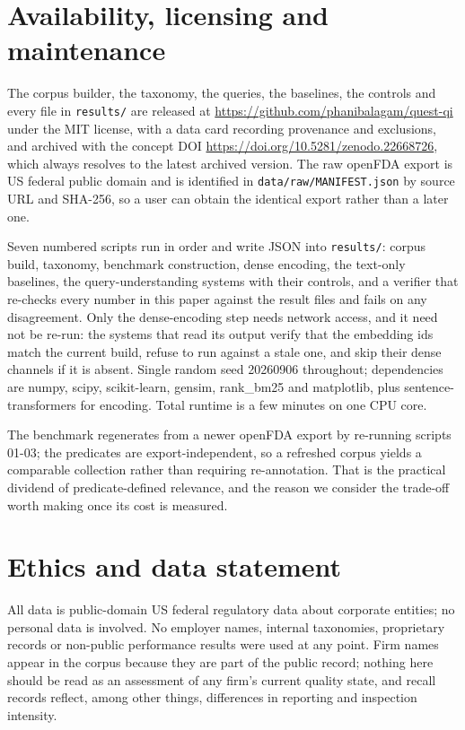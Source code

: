 \documentclass[runningheads]{llncs}
\begin{document}
\section{Availability, licensing and maintenance}
The corpus builder, the taxonomy, the queries, the baselines, the controls and every file in \texttt{results/} are released at \url{https://github.com/phanibalagam/quest-qi} under the MIT license, with a data card recording provenance and exclusions, and archived with the concept DOI \url{https://doi.org/10.5281/zenodo.22668726}, which always resolves to the latest archived version. The raw openFDA export is US federal public domain and is identified in \texttt{data/raw/\allowbreak{}MANIFEST.json} by source URL and SHA-256, so a user can obtain the identical export rather than a later one.

Seven numbered scripts run in order and write JSON into \texttt{results/}: corpus build, taxonomy, benchmark construction, dense encoding, the text-only baselines, the query-understanding systems with their controls, and a verifier that re-checks every number in this paper against the result files and fails on any disagreement. Only the dense-encoding step needs network access, and it need not be re-run: the systems that read its output verify that the embedding ids match the current build, refuse to run against a stale one, and skip their dense channels if it is absent. Single random seed 20260906 throughout; dependencies are numpy, scipy, scikit-learn, gensim, rank\_bm25 and matplotlib, plus sentence-transformers for encoding. Total runtime is a few minutes on one CPU core.

The benchmark regenerates from a newer openFDA export by re-running scripts 01-03; the predicates are export-independent, so a refreshed corpus yields a comparable collection rather than requiring re-annotation. That is the practical dividend of predicate-defined relevance, and the reason we consider the trade-off worth making once its cost is measured.


\section*{Ethics and data statement}
All data is public-domain US federal regulatory data about corporate entities; no personal data is involved. No employer names, internal taxonomies, proprietary records or non-public performance results were used at any point. Firm names appear in the corpus because they are part of the public record; nothing here should be read as an assessment of any firm's current quality state, and recall records reflect, among other things, differences in reporting and inspection intensity.




\end{document}
